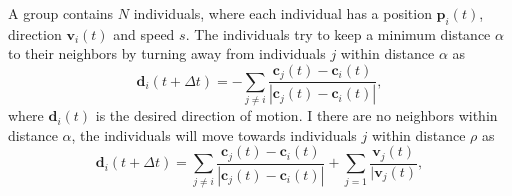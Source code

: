 A group contains $N$ individuals, where each individual has a position $\boldsymbol{p}_i(t)$, direction $\boldsymbol{v}_i(t)$ and speed $s$. The individuals try to keep a minimum distance $\alpha$ to their neighbors by turning away from individuals $j$ within distance $\alpha$ as
\begin{equation}
\boldsymbol{d}_i (t+\Delta t) = - \sum_{j \neq i} \frac{\boldsymbol{c}_j (t) - \boldsymbol{c}_i (t)}{|\boldsymbol{c}_j (t) - \boldsymbol{c}_i (t) |},
\label{eq:repulsion}
\end{equation}
where $\boldsymbol{d}_i(t)$ is the desired direction of motion. I there are no neighbors within distance $\alpha$, the individuals will move towards individuals $j$ within distance $\rho$ as
\begin{equation}
\boldsymbol{d}_i (t+\Delta t) = \sum_{j \neq i} \frac{\boldsymbol{c}_j (t)- \boldsymbol{c}_i (t)}{|\boldsymbol{c}_j (t) - \boldsymbol{c}_i (t)|} + \sum_{j = 1} \frac{\boldsymbol{v}_j (t)}{|\boldsymbol{v}_j (t)},
\label{eq:attraction}
\end{equation}